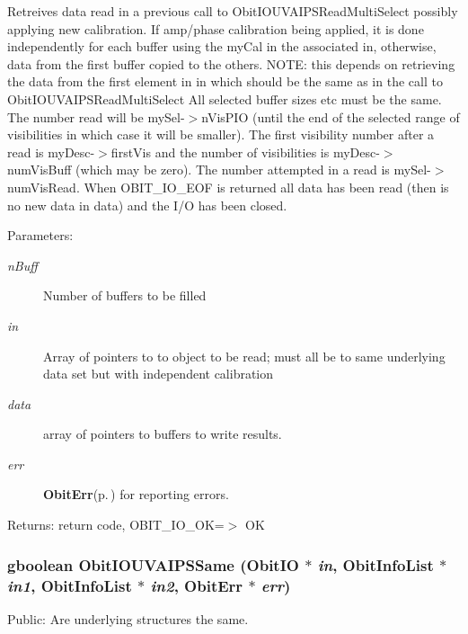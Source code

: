Retreives data read in a previous call to Obit\-IOUVAIPSRead\-Multi\-Select possibly applying new calibration. If amp/phase calibration being applied, it is done independently for each buffer using the my\-Cal in the associated in, otherwise, data from the first buffer copied to the others. NOTE: this depends on retrieving the data from the first element in in which should be the same as in the call to Obit\-IOUVAIPSRead\-Multi\-Select All selected buffer sizes etc must be the same. The number read will be my\-Sel-$>$n\-Vis\-PIO (until the end of the selected range of visibilities in which case it will be smaller). The first visibility number after a read is my\-Desc-$>$first\-Vis and the number of visibilities is my\-Desc-$>$num\-Vis\-Buff (which may be zero). The number attempted in a read is my\-Sel-$>$num\-Vis\-Read. When OBIT\_\-IO\_\-EOF is returned all data has been read (then is no new data in data) and the I/O has been closed. \begin{Desc}
\item[Parameters:]
\begin{description}
\item[{\em n\-Buff}]Number of buffers to be filled \item[{\em in}]Array of pointers to to object to be read; must all be to same underlying data set but with independent calibration \item[{\em data}]array of pointers to buffers to write results. \item[{\em err}]{\bf Obit\-Err}{\rm (p.\,\pageref{structObitErr})} for reporting errors. \end{description}
\end{Desc}
\begin{Desc}
\item[Returns:]return code, OBIT\_\-IO\_\-OK=$>$ OK \end{Desc}
\subsubsection{\setlength{\rightskip}{0pt plus 5cm}gboolean Obit\-IOUVAIPSSame ({\bf Obit\-IO} $\ast$ {\em in}, {\bf Obit\-Info\-List} $\ast$ {\em in1}, {\bf Obit\-Info\-List} $\ast$ {\em in2}, {\bf Obit\-Err} $\ast$ {\em err})}\label{ObitIOUVAIPS_8c_a12}


Public: Are underlying structures the same. 

